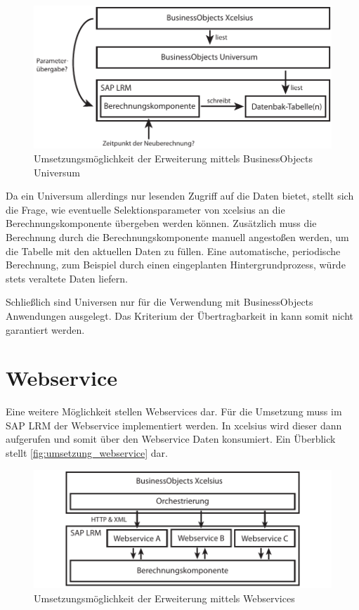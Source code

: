 \begin{onehalfspacing}
\begin{figure}[ht]
\centering
\setlength{\unitlength}{1mm}
\includegraphics[width=15cm]{images/Abbildung9-Umsetzung-Universum.pdf}
\caption{Umsetzungsmöglichkeit der Erweiterung mittels BusinessObjects Universum \label{fig:umsetzung_universe}}
\end{figure}

Da ein Universum allerdings nur lesenden Zugriff auf die Daten bietet, stellt sich die Frage, wie eventuelle Selektionsparameter von \gls{xcelsius} an die Berechnungskomponente übergeben werden können. Zusätzlich muss die Berechnung durch die Berechnungskomponente manuell angestoßen werden, um die Tabelle mit den aktuellen Daten zu füllen. Eine automatische, periodische Berechnung, zum Beispiel durch einen eingeplanten Hintergrundprozess, würde stets veraltete Daten liefern.

Schließlich sind Universen nur für die Verwendung mit BusinessObjects Anwendungen ausgelegt. Das Kriterium der Übertragbarkeit in  kann somit nicht garantiert werden.

\section{Webservice}
Eine weitere Möglichkeit stellen Webservices dar. Für die Umsetzung muss im SAP LRM der Webservice implementiert werden. In \gls{xcelsius} wird dieser dann aufgerufen und somit über den Webservice Daten konsumiert. Ein Überblick stellt \vref{fig:umsetzung_webservice} dar.

\begin{figure}[ht]
\centering
\setlength{\unitlength}{1mm}
\includegraphics[width=15cm]{images/Abbildung10-Umsetzung-Webservices.pdf}
\caption{Umsetzungsmöglichkeit der Erweiterung mittels Webservices \label{fig:umsetzung_webservice}}
\end{figure} 


\end{onehalfspacing}
